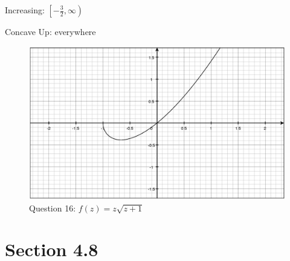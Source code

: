 \documentclass[fleqn]{exam}
\begin{document}
\begin{description}
\begin{itemize*}
  \item Increasing: $\left[- \frac{3}{2}, \infty \right)$
  \item Concave Up: everywhere
\end{itemize*}

\begin{figure}[H]
  \centering
  \includegraphics[scale=.3]{4.7.16.eps}
  \caption*{Question 16: $f(z) = z \sqrt{z + 1}$}
\end{figure}

\end{description}

\section{Section 4.8}
\end{document}
